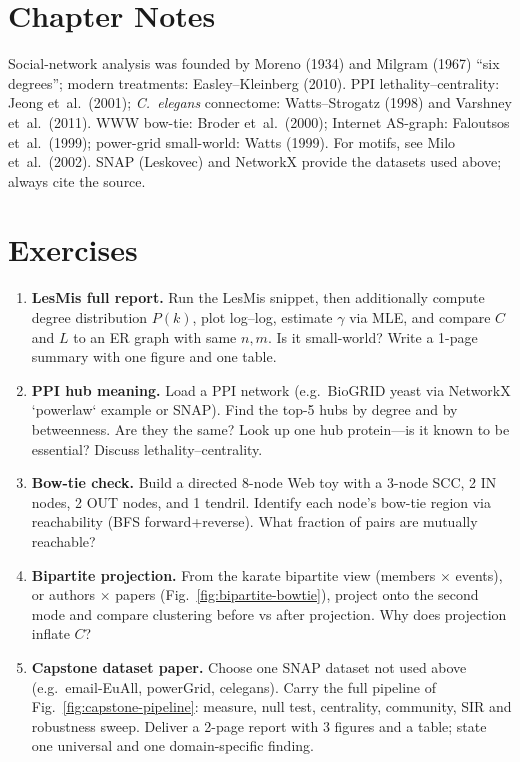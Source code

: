 \section{Chapter Notes}
Social-network analysis was founded by Moreno (1934) and Milgram (1967) ``six degrees''; modern treatments: Easley--Kleinberg (2010). PPI lethality--centrality: Jeong et~al.\ (2001); \emph{C.~elegans} connectome: Watts--Strogatz (1998) and Varshney et~al.\ (2011). WWW bow-tie: Broder et~al.\ (2000); Internet AS-graph: Faloutsos et~al.\ (1999); power-grid small-world: Watts (1999). For motifs, see Milo et~al.\ (2002). SNAP (Leskovec) and NetworkX provide the datasets used above; always cite the source.

\section{Exercises}
\label{sec:ch08-exercises}
\begin{enumerate}[label=E8.\arabic*, leftmargin=*, itemsep=0.8em]
    \item \textbf{LesMis full report.} Run the LesMis snippet, then additionally compute degree distribution $P(k)$, plot log--log, estimate $\gamma$ via MLE, and compare $C$ and $L$ to an ER graph with same $n,m$. Is it small-world? Write a 1-page summary with one figure and one table.
    \item \textbf{PPI hub meaning.} Load a PPI network (e.g.\ BioGRID yeast via NetworkX `powerlaw` example or SNAP). Find the top-5 hubs by degree and by betweenness. Are they the same? Look up one hub protein---is it known to be essential? Discuss lethality--centrality.
    \item \textbf{Bow-tie check.} Build a directed 8-node Web toy with a 3-node SCC, 2 IN nodes, 2 OUT nodes, and 1 tendril. Identify each node's bow-tie region via reachability (BFS forward+reverse). What fraction of pairs are mutually reachable?
    \item \textbf{Bipartite projection.} From the karate bipartite view (members $\times$ events), or authors $\times$ papers (Fig.~\ref{fig:bipartite-bowtie}), project onto the second mode and compare clustering before vs after projection. Why does projection inflate $C$?
    \item \textbf{Capstone dataset paper.} Choose one SNAP dataset not used above (e.g.\ email-EuAll, powerGrid, celegans). Carry the full pipeline of Fig.~\ref{fig:capstone-pipeline}: measure, null test, centrality, community, SIR and robustness sweep. Deliver a 2-page report with 3 figures and a table; state one universal and one domain-specific finding.
\end{enumerate}
